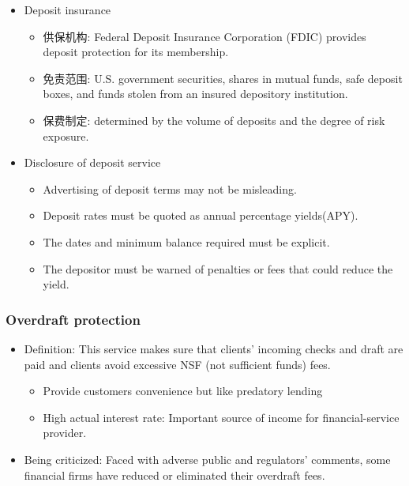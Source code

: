 \begin{itemize}
\item Deposit insurance
    \begin{itemize}
    \item 供保机构: Federal Deposit Insurance Corporation (FDIC) provides deposit protection for its membership.
    \item 免责范围: U.S. government securities, shares in mutual funds, safe deposit boxes, and funds stolen from an insured depository institution.
    \item 保费制定: determined by the volume of deposits and the degree of risk exposure.
    \end{itemize}
\item Disclosure of deposit service
    \begin{itemize}
    \item Advertising of deposit terms may not be misleading.
    \item Deposit rates must be quoted as annual percentage yields(APY).
    \item The dates and minimum balance required must be explicit.
    \item The depositor must be warned of penalties or fees that could reduce the yield.
    \end{itemize}

\end{itemize}



\subsubsection{Overdraft protection}
\begin{itemize}
\item Definition: This service makes sure that clients' incoming checks and draft are paid and clients avoid excessive NSF (not sufficient funds) fees.
    \begin{itemize}
    \item Provide customers convenience but like predatory lending
    \item High actual interest rate: Important source of income for financial-service provider.
    \end{itemize}
\item Being criticized: Faced with adverse public and regulators' comments, some financial firms have reduced or eliminated their overdraft fees.
\end{itemize}



